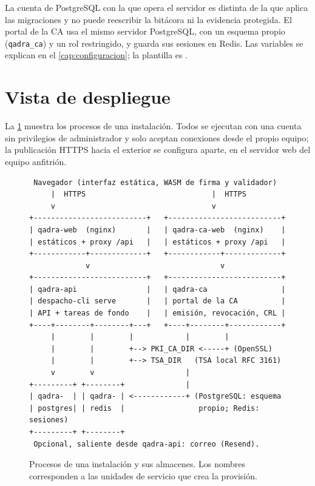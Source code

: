 La cuenta de PostgreSQL con la que opera el servidor es distinta de la que
aplica las migraciones y no puede reescribir la bitácora ni la evidencia
protegida. El portal de la CA usa el mismo servidor PostgreSQL, con un esquema
propio (\texttt{qadra\_ca}) y un rol restringido, y guarda sus sesiones en
Redis. Las variables se explican en el
\cref{cap:configuracion}; la plantilla es .


\section{Vista de despliegue}\label{sec:arq-despliegue}

La \cref{fig:arq-despliegue} muestra los procesos de una instalación. Todos
se ejecutan con una cuenta sin privilegios de administrador y solo aceptan
conexiones desde el propio equipo; la publicación HTTPS hacia el exterior se
configura aparte, en el servidor web del equipo anfitrión.

\begin{figure}[H]
\centering
\begin{minipage}{0.92\textwidth}
\small
\begin{verbatim}
 Navegador (interfaz estática, WASM de firma y validador)
     |  HTTPS                             |  HTTPS
     v                                    v
+--------------------------+   +--------------------------+
| qadra-web  (nginx)       |   | qadra-ca-web  (nginx)    |
| estáticos + proxy /api   |   | estáticos + proxy /api   |
+------------+-------------+   +------------+-------------+
             v                              v
+--------------------------+   +--------------------------+
| qadra-api                |   | qadra-ca                 |
| despacho-cli serve       |   | portal de la CA          |
| API + tareas de fondo    |   | emisión, revocación, CRL |
+----+--------+--------+---+   +----+--------+------------+
     |        |        |            |        |
     |        |        +--> PKI_CA_DIR <-----+ (OpenSSL)
     |        |        +--> TSA_DIR   (TSA local RFC 3161)
     v        v                     |
+---------+ +--------+              |
| qadra-  | | qadra- | <------------+ (PostgreSQL: esquema
| postgres| | redis  |                 propio; Redis: sesiones)
+---------+ +--------+
 Opcional, saliente desde qadra-api: correo (Resend).
\end{verbatim}
\end{minipage}
\caption{Procesos de una instalación y sus almacenes. Los nombres
  corresponden a las unidades de servicio que crea la
  provisión.}\label{fig:arq-despliegue}
\end{figure}

